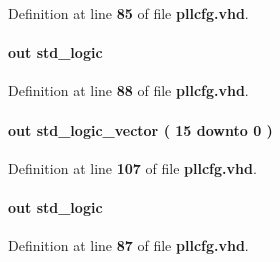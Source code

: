 Definition at line {\bf 85} of file {\bf pllcfg.\+vhd}.

\paragraph[{c4\+\_\+byp}]{ {\bfseries \textcolor{keywordflow}{out}\textcolor{vhdlchar}{ }} {\bfseries \textcolor{comment}{std\+\_\+logic}\textcolor{vhdlchar}{ }} \hspace{0.3cm}{\ttfamily [Port]}}\label{classpllcfg_a81d09757cb53437ea01004d339174577}


Definition at line {\bf 88} of file {\bf pllcfg.\+vhd}.

\paragraph[{c4\+\_\+cnt}]{ {\bfseries \textcolor{keywordflow}{out}\textcolor{vhdlchar}{ }} {\bfseries \textcolor{comment}{std\+\_\+logic\+\_\+vector}\textcolor{vhdlchar}{ }\textcolor{vhdlchar}{(}\textcolor{vhdlchar}{ }\textcolor{vhdlchar}{ } \textcolor{vhdldigit}{15} \textcolor{vhdlchar}{ }\textcolor{keywordflow}{downto}\textcolor{vhdlchar}{ }\textcolor{vhdlchar}{ } \textcolor{vhdldigit}{0} \textcolor{vhdlchar}{ }\textcolor{vhdlchar}{)}\textcolor{vhdlchar}{ }} \hspace{0.3cm}{\ttfamily [Port]}}\label{classpllcfg_a713f0325aacfb2e4146c2a6cc9ec9330}


Definition at line {\bf 107} of file {\bf pllcfg.\+vhd}.

\paragraph[{c4\+\_\+odddiv}]{ {\bfseries \textcolor{keywordflow}{out}\textcolor{vhdlchar}{ }} {\bfseries \textcolor{comment}{std\+\_\+logic}\textcolor{vhdlchar}{ }} \hspace{0.3cm}{\ttfamily [Port]}}\label{classpllcfg_ac35848ad1a1821d23f47551acb3e95b1}


Definition at line {\bf 87} of file {\bf pllcfg.\+vhd}.

